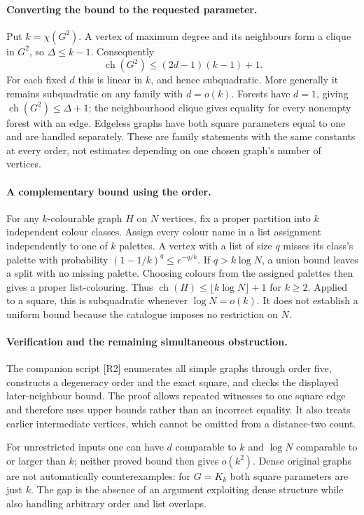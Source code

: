 \documentclass[11pt,a4paper]{article}
\begin{document}
\paragraph{Converting the bound to the requested parameter.}
Put $k=\chi(G^2)$. A vertex of maximum degree and its neighbours
form a clique in $G^2$, so $\Delta\le k-1$. Consequently
\[
 \operatorname{ch}(G^2)\le(2d-1)(k-1)+1.
\]
For each fixed $d$ this is linear in $k$, and hence subquadratic.
More generally it remains subquadratic on any family with $d=o(k)$.
Forests have $d=1$, giving $\operatorname{ch}(G^2)\le\Delta+1$;
the neighbourhood clique gives equality for every nonempty forest
with an edge. Edgeless graphs have both square parameters equal to
one and are handled separately. These are family statements with the
same constants at every order, not estimates depending on one chosen
graph's number of vertices.

\paragraph{A complementary bound using the order.}
For any $k$-colourable graph $H$ on $N$ vertices, fix a proper
partition into $k$ independent colour classes. Assign every colour
name in a list assignment independently to one of $k$ palettes.
A vertex with a list of size $q$ misses its class's palette with
probability $(1-1/k)^q\le e^{-q/k}$. If $q>k\log N$, a union
bound leaves a split with no missing palette. Choosing colours from
the assigned palettes then gives a proper list-colouring. Thus
$\operatorname{ch}(H)\le\lfloor k\log N\rfloor+1$ for $k\ge2$.
Applied to a square, this is subquadratic whenever $\log N=o(k)$.
It does not establish a uniform bound because the catalogue imposes
no restriction on $N$.

\paragraph{Verification and the remaining simultaneous obstruction.}
The companion script [R2] enumerates all simple graphs through order
five, constructs a degeneracy order and the exact square, and checks
the displayed later-neighbour bound. The proof allows repeated witnesses
to one square edge and therefore uses upper bounds rather than an
incorrect equality. It also treats earlier intermediate vertices, which
cannot be omitted from a distance-two count.

For unrestricted inputs one can have $d$ comparable to $k$ and
$\log N$ comparable to or larger than $k$; neither proved bound
then gives $o(k^2)$. Dense original graphs are not automatically
counterexamples: for $G=K_k$ both square parameters are just $k$.
The gap is the absence of an argument exploiting dense structure while
also handling arbitrary order and list overlaps.
\end{document}
